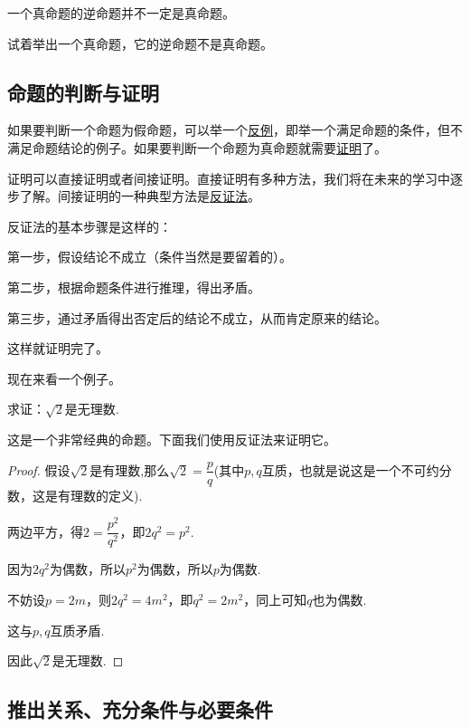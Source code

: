 \documentclass[lang=cn,math=cm,chinesefont=nofont,11pt,scheme=chinese,onecol]{elegantbook}
\begin{document}
\begin{remark}
  一个真命题的逆命题并不一定是真命题。
\end{remark}

\begin{exercise}\label{exer:202405021028}
  试着举出一个真命题，它的逆命题不是真命题。
\end{exercise}


\subsection{命题的判断与证明}

如果要判断一个命题为假命题，可以举一个\underline{反例}，即举一个满足命题的条件，但不满足命题结论的例子。如果要判断一个命题为真命题就需要\underline{证明}了。

证明可以直接证明或者间接证明。直接证明有多种方法，我们将在未来的学习中逐步了解。间接证明的一种典型方法是\underline{反证法}。

反证法的基本步骤是这样的：

第一步，假设结论不成立（条件当然是要留着的）。

第二步，根据命题条件进行推理，得出矛盾。

第三步，通过矛盾得出否定后的结论不成立，从而肯定原来的结论。

这样就证明完了。

\hspace*{\fill}

现在来看一个例子。

\begin{example}
  求证：$\sqrt{2}$是无理数.
\end{example}
这是一个非常经典的命题。下面我们使用反证法来证明它。
\begin{proof}
  假设$\sqrt{2}$是有理数,那么$\sqrt{2}=\dfrac{p}{q}$(其中$p,q$互质，也就是说这是一个不可约分数，这是有理数的定义).

  两边平方，得$2=\dfrac{p^2}{q^2}$，即$2q^2=p^2$.

  因为$2q^2$为偶数，所以$p^2$为偶数，所以$p$为偶数.

  不妨设$p=2m$，则$2q^2=4m^2$，即$q^2=2m^2$，同上可知$q$也为偶数.

  这与$p,q$互质矛盾.

  因此$\sqrt{2}$是无理数.

\end{proof}

\subsection{推出关系、充分条件与必要条件}
\end{document}
